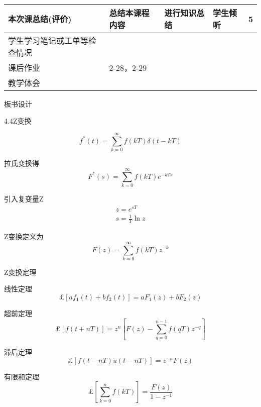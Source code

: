 {\begin{landscape}
\begin{longtable}{|m{10mm}|m{50mm}|m{50mm}|m{50mm}|m{15mm}|}
\centering 本次课总结(评价)&总结本课程内容 &进行知识总结 &学生倾听 &5 \\\hline
\centering 学生学习笔记或工单等检查情况&\multicolumn{4}{m{165mm}|}{\quad}\\\hline
\centering 课后作业&\multicolumn{4}{m{165mm}|}{2-28，2-29}\\\hline
\centering 教学体会&\multicolumn{4}{m{165mm}|}{\quad}\\
\end{longtable}

\end{landscape}
\clearpage
\begin{center}
{\huge 板书设计}
\end{center}
}

 \begin{frame}{4.4Z变换} 
 \begin{block}{}
\[f^*(t)=\sum\limits_{k=0}^\infty f(kT)\delta(t-kT)\]
 \end{block}
 \begin{block}{拉氏变换得}
 \[F^*(s)=\sum\limits_{k=0}^\infty f(kT)e^{-kTs}\]
 \end{block}
 \end{frame}
 
 \begin{frame}
 \begin{block}{引入复变量Z}
\begin{eqnarray*}
z=e^{sT}\\
s=\frac{1}{T}\ln z
\end{eqnarray*}
\end{block}
\begin{block}{Z变换定义为}
\[F(z)=\sum\limits_{k=0}^\infty f(kT)z^{-k}\]
\end{block}
\end{frame}

\begin{frame}{Z变换定理}
\begin{block}{线性定理}
\[\pounds[af_1(t)+bf_2(t)]=aF_1(z)+bF_2(z)\]
\end{block}
\begin{block}{超前定理}
\[\pounds[f(t+nT)]=z^n\left[F(z)-\sum\limits_{q=0}^{n-1}f(qT)z^{-q}\right]\]
\end{block}

\end{frame}

\begin{frame}
\begin{block}{滞后定理}
\begin{equation*}
\pounds[f(t-nT)u(t-nT)]=z^{-n}F(z)
\end{equation*}
\end{block}
\begin{block}{有限和定理}
\begin{equation*}
\pounds\left[\sum\limits_{k=0}^nf(kT)\right]=\frac{F(z)}{1-z^{-1}}
\end{equation*}
\end{block}
\end{frame}

